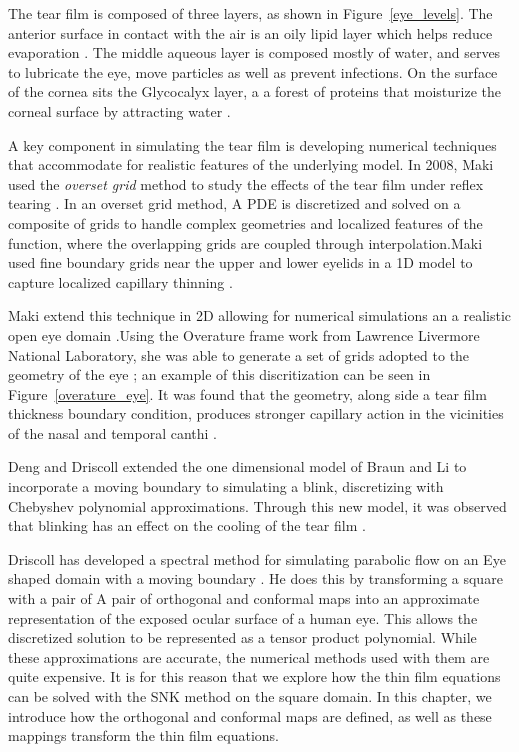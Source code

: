 	The tear film is composed of three layers, as shown in Figure~\ref{eye_levels}. The anterior surface in contact with the air is an oily lipid layer which helps reduce evaporation \cite{norn1979semiquantitative,mishima1961oily}. The middle aqueous layer is composed mostly of water, and serves to lubricate the eye, move particles as well as prevent infections. On the surface of the cornea sits the Glycocalyx layer, a a forest of proteins that moisturize the corneal surface by attracting water \cite{gipson2004distribution}. 
	
	A key component in simulating the tear film is developing numerical techniques that accommodate for realistic features of the underlying model. In 2008, Maki used the \textit{overset grid} method to study the effects of the tear film under reflex tearing \cite{maki2008overset}. In an overset grid method, A PDE is discretized and solved on a composite of grids to handle complex geometries and localized features of the function, where the overlapping grids are coupled through interpolation.Maki used fine boundary grids near the upper and lower eyelids in a 1D model to capture localized capillary thinning \cite{maki2008overset}.
	
	Maki extend this technique in 2D allowing for numerical simulations an a realistic open eye domain \cite{maki2010tear,maki2010tear2}.Using the Overature frame work from Lawrence Livermore National Laboratory, she was able to generate a set of grids adopted to the geometry of the eye \cite{chesshire1990composite}; an example of this discritization can be seen in Figure~\ref{overature_eye}. It was found that the geometry, along side a tear film thickness boundary condition, produces stronger capillary action in the vicinities of the nasal and temporal canthi \cite{maki2010tear}.

Deng and Driscoll extended the one dimensional model of Braun and Li \cite{li2012model} to incorporate a moving boundary to simulating a blink, discretizing with Chebyshev polynomial approximations. Through this new model, it was observed that blinking has an effect on the cooling of the tear film \cite{deng2013model,deng2014heat}. 

Driscoll has developed a spectral method for simulating parabolic flow on an Eye shaped domain with a moving boundary \cite{driscoll2018simulation}. He does this by transforming a square with a pair of A pair of orthogonal and conformal maps into an approximate representation of the exposed ocular surface of a human eye. This allows the discretized solution to be represented as a tensor product polynomial. While these approximations are accurate, the numerical methods used with them are quite expensive. It is for this reason that we explore how the thin film equations can be solved with the SNK method on the square domain. In this chapter, we introduce how the orthogonal and conformal maps are defined, as well as these mappings transform the thin film equations.



